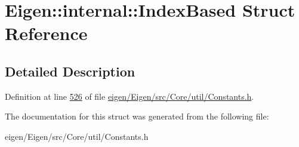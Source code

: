 \hypertarget{struct_eigen_1_1internal_1_1_index_based}{}\section{Eigen\+:\+:internal\+:\+:Index\+Based Struct Reference}
\label{struct_eigen_1_1internal_1_1_index_based}


\subsection{Detailed Description}


Definition at line \hyperlink{eigen_2_eigen_2src_2_core_2util_2_constants_8h_source_l00526}{526} of file \hyperlink{eigen_2_eigen_2src_2_core_2util_2_constants_8h_source}{eigen/\+Eigen/src/\+Core/util/\+Constants.\+h}.



The documentation for this struct was generated from the following file\+:\begin{DoxyCompactItemize}
\item 
eigen/\+Eigen/src/\+Core/util/\+Constants.\+h\end{DoxyCompactItemize}
